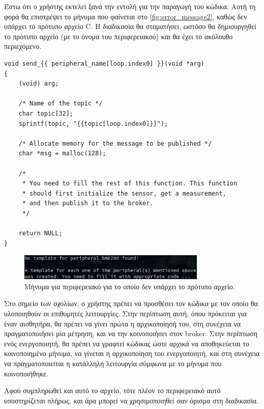 Έστω ότι ο χρήστης εκτελεί ξανά την εντολή για την παραγωγή του κώδικα. Αυτή τη φορά θα επιστρέψει το μήνυμα που φαίνεται στο \autoref{fig:error_message2}, καθώς δεν υπάρχει το πρότυπο αρχείο C. Η διαδικασία θα σταματήσει, ωστόσο θα δημιουργηθεί το πρότυπο αρχείο (με το όνομα του περιφερειακού) και θα έχει το ακόλουθο περιεχόμενο.

\begin{lstlisting}
void send_{{ peripheral_name[loop.index0] }}(void *arg)
{
	(void) arg;
	
	/* Name of the topic */
	char topic[32];
	sprintf(topic, "{{topic[loop.index0]}}");
	
	/* Allocate memory for the message to be published */
	char *msg = malloc(128);
	
	/*
	 * You need to fill the rest of this function. This function 
	 * should first initialize the sensor, get a measurement,
	 * and then publish it to the broker. 
	 */
	
	return NULL;
}
\end{lstlisting}

\begin{figure}[!ht]
	\centering
	\includegraphics[width=0.8\textwidth]{./images/chapter6/error_message2.png}
	\caption{Μήνυμα για περιφερειακό για το οποίο δεν υπάρχει το πρότυπο αρχείο.}
	\label{fig:error_message2}
\end{figure}

Στο σημείο των σχολίων, ο χρήστης πρέπει να προσθέσει τον κώδικα με τον οποίο θα υλοποιηθούν οι επιθυμητές λειτουργίες. Στην περίπτωση αυτή, όπου πρόκειται για έναν αισθητήρα, θα πρέπει να γίνει πρώτα η αρχικοποίησή του, στη συνέχεια να πραγματοποιήσει μία μέτρηση, και να την κοινοποιήσει στον broker. Στην περίπτωση ενός ενεργοποιητή, θα πρέπει να γραφτεί κώδικας ώστε αρχικά να αποθηκεύεται το κοινοποιημένο μήνυμα, να γίνεται η αρχικοποίηση του ενεργοποιητή, και στη συνέχεια να πραγματοποιείται η κατάλληλη λειτουργία σύμφωνα με το μήνυμα που κοινοποιήθηκε.

Αφού συμπληρωθεί και αυτό το αρχείο, τότε πλέον το περιφερειακό αυτό υποστηρίζεται πλήρως, και άρα μπορεί να χρησιμοποιηθεί σαν όρισμα στη διαδικασία.
